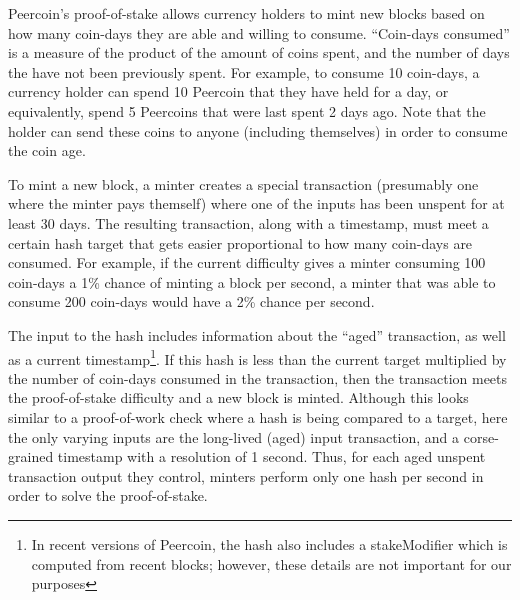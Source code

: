 Peercoin's proof-of-stake allows currency holders to mint new blocks based on
how many coin-days they are able and willing to consume. ``Coin-days
consumed'' is a measure of the product of the amount of coins spent, and the
number of days the have not been previously spent. For example, to consume 10
coin-days, a currency holder can spend 10 Peercoin that they have held for a
day, or equivalently, spend 5 Peercoins that were last spent 2 days ago. Note
that the holder can send these coins to anyone (including themselves) in order
to consume the coin age.

To mint a new block, a minter creates a special transaction (presumably one
where the minter pays themself) where one of the
inputs has been unspent for at least 30 days. The resulting transaction, along
with a timestamp, must meet a certain hash target that gets easier proportional to how many
coin-days are consumed. For example, if the current difficulty gives a minter
consuming 100 coin-days a 1\% chance of minting a block per second, a minter
that was able to consume 200 coin-days would have a 2\% chance per second.

The input to the hash includes information about the ``aged'' transaction, as
well as a current timestamp\footnote{In recent versions of Peercoin, the hash
also includes a stakeModifier which is computed from recent blocks; however,
these details are not important for our purposes}. If this hash is less than the
current target multiplied by the number of coin-days consumed in the
transaction, then the transaction meets the proof-of-stake difficulty and a new
block is minted. Although this looks similar to a proof-of-work check where a
hash is being compared to a target, here the only varying inputs are the
long-lived (aged) input transaction, and a corse-grained timestamp with a
resolution of 1 second. Thus, for each aged unspent transaction output they
control, minters perform only one hash per second in order to solve the
proof-of-stake.

%



